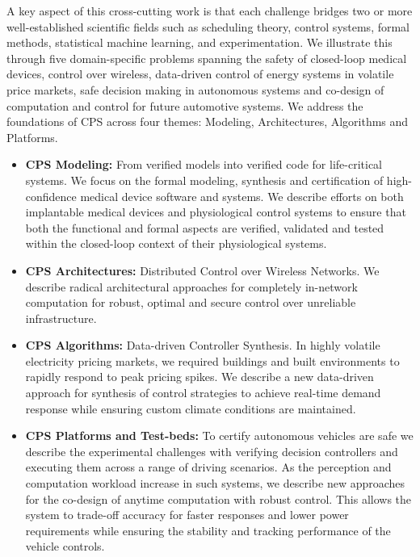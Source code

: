 A key aspect of this cross-cutting work is that each challenge bridges two or more well-established scientific fields such as scheduling theory, control systems, formal methods, statistical machine learning, and experimentation. We illustrate this through five domain-specific problems spanning the safety of closed-loop medical devices, control over wireless, data-driven control of energy systems in volatile price markets, safe decision making in autonomous systems and co-design of computation and control for future automotive systems. We address the foundations of CPS across four themes: Modeling, Architectures, Algorithms and Platforms.
\begin{itemize}
\item \textbf{CPS Modeling:} From verified models into verified code for life-critical systems. We focus on the formal modeling, synthesis and certification of high-confidence medical device software and systems. We describe efforts on both implantable medical devices and physiological control systems to ensure that both the functional and formal aspects are verified, validated and tested within the closed-loop context of their physiological systems. 
\item \textbf{CPS Architectures:} Distributed Control over Wireless Networks. We describe radical architectural approaches for completely in-network computation for robust, optimal and secure control over unreliable infrastructure.
\item \textbf{CPS Algorithms:} Data-driven Controller Synthesis. In highly volatile electricity pricing markets, we required buildings and built environments to rapidly respond to peak pricing spikes. We describe a new data-driven approach for synthesis of control strategies to achieve real-time demand response while ensuring custom climate conditions are maintained.
\item \textbf{CPS Platforms and Test-beds:} To certify autonomous vehicles are safe we describe the experimental challenges with verifying decision controllers and executing them across a range of driving scenarios. As the perception and computation workload increase in such systems, we describe new approaches for the co-design of anytime computation with robust control. This allows the system to trade-off accuracy for faster responses and lower power requirements while ensuring the stability and tracking performance of the vehicle controls. 
\end{itemize}
